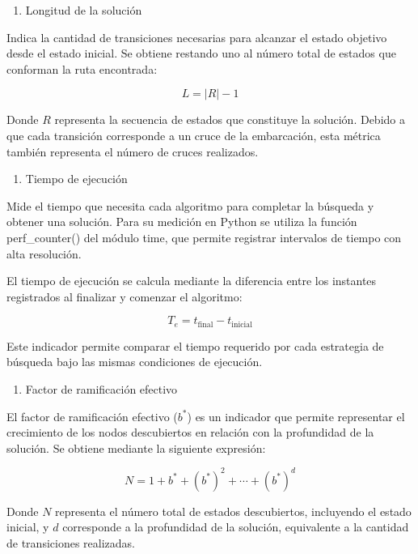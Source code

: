 \documentclass[
  spanish,
]{llncs}
\providecommand{\tightlist}{%
  \setlength{\itemsep}{0pt}\setlength{\parskip}{0pt}}
\begin{document}
\begin{enumerate}
\def\labelenumi{\arabic{enumi}.}
\setcounter{enumi}{2}
\tightlist
\item
  Longitud de la solución
\end{enumerate}

Indica la cantidad de transiciones necesarias para alcanzar el estado
objetivo desde el estado inicial. Se obtiene restando uno al número
total de estados que conforman la ruta encontrada:

\[
L=|R|-1
\]

Donde \(R\) representa la secuencia de estados que constituye la
solución. Debido a que cada transición corresponde a un cruce de la
embarcación, esta métrica también representa el número de cruces
realizados.

\begin{enumerate}
\def\labelenumi{\arabic{enumi}.}
\setcounter{enumi}{3}
\tightlist
\item
  Tiempo de ejecución
\end{enumerate}

Mide el tiempo que necesita cada algoritmo para completar la búsqueda y
obtener una solución. Para su medición en Python se utiliza la función
perf\_counter() del módulo time, que permite registrar intervalos de
tiempo con alta resolución.

El tiempo de ejecución se calcula mediante la diferencia entre los
instantes registrados al finalizar y comenzar el algoritmo:

\[
T_e=t_{\text{final}}-t_{\text{inicial}}
\]

Este indicador permite comparar el tiempo requerido por cada estrategia
de búsqueda bajo las mismas condiciones de ejecución.

\begin{enumerate}
\def\labelenumi{\arabic{enumi}.}
\setcounter{enumi}{4}
\tightlist
\item
  Factor de ramificación efectivo
\end{enumerate}

El factor de ramificación efectivo (\(b^*\)) es un indicador que permite
representar el crecimiento de los nodos descubiertos en relación con la
profundidad de la solución. Se obtiene mediante la siguiente expresión:

\[
N = 1 + b^{*} + (b^{*})^2 + \cdots + (b^{*})^d
\]

Donde \(N\) representa el número total de estados descubiertos,
incluyendo el estado inicial, y \(d\) corresponde a la profundidad de la
solución, equivalente a la cantidad de transiciones realizadas.
\end{document}

